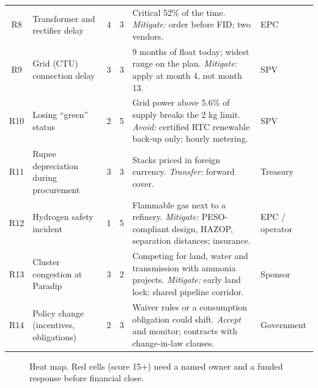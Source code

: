 \begin{center}
\begin{xltabular}{\textwidth}{@{}c P{30mm} c c L P{17mm}@{}}
R8 & Transformer and rectifier delay & 4 & 3 & Critical 52\% of the time. \emph{Mitigate:} order before FID; two vendors. & EPC\\
R9 & Grid (CTU) connection delay & 3 & 3 & 9 months of float today; widest range on the plan. \emph{Mitigate:} apply at month 4, not month 13. & SPV\\
R10 & Losing ``green'' status & 2 & 5 & Grid power above 5.6\% of supply breaks the 2 kg limit. \emph{Avoid:} certified RTC renewable back-up only; hourly metering. & SPV\\
R11 & Rupee depreciation during procurement & 3 & 3 & Stacks priced in foreign currency. \emph{Transfer:} forward cover. & Treasury\\
R12 & Hydrogen safety incident & 1 & 5 & Flammable gas next to a refinery. \emph{Mitigate:} PESO-compliant design, HAZOP, separation distances; insurance. & EPC / operator\\
R13 & Cluster congestion at Paradip & 3 & 2 & Competing for land, water and transmission with ammonia projects. \emph{Mitigate:} early land lock; shared pipeline corridor. & Sponsor\\
R14 & Policy change (incentives, obligations) & 2 & 3 & Waiver rules or a consumption obligation could shift. \emph{Accept} and monitor; contracts with change-in-law clauses. & Government\\
\bottomrule
\end{xltabular}
\end{center}

\begin{figure}[H]
\centering
{}
\caption{Heat map. Red cells (score 15+) need a named owner and a funded response before financial close.}
\end{figure}

